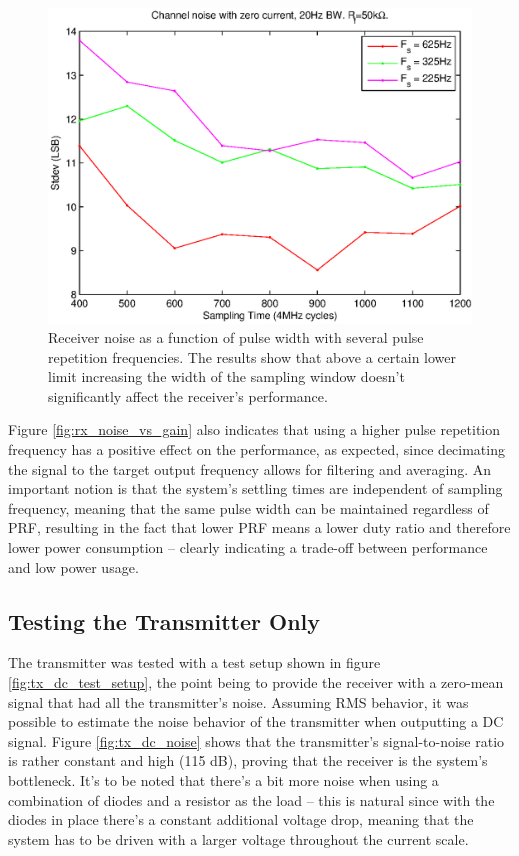 \begin{figure}[htcb]
\begin{center}
\includegraphics[scale=0.8]{kuvat/measurements/rx_noise_vs_pulse_length.eps}
\caption{Receiver noise as a function of pulse width with several pulse repetition frequencies. The results show that above a certain lower limit increasing the width of the sampling window doesn't significantly affect the receiver's performance.}
\label{fig:rx_noise_vs_pulse_length}
\end{center}
\end{figure}

Figure \ref{fig:rx_noise_vs_gain} also indicates that using a higher pulse repetition frequency has a positive effect on the performance, as expected, since decimating the signal to the target output frequency allows for filtering and averaging. An important notion is that the system's settling times are independent of sampling frequency, meaning that the same pulse width can be maintained regardless of PRF, resulting in the fact that lower PRF means a lower duty ratio and therefore lower power consumption -- clearly indicating a trade-off between performance and low power usage.

\subsection{Testing the Transmitter Only}

The transmitter was tested with a test setup shown in figure \ref{fig:tx_dc_test_setup}, the point being to provide the receiver with a zero-mean signal that had all the transmitter's noise. Assuming RMS behavior, it was possible to estimate the noise behavior of the transmitter when outputting a DC signal. Figure \ref{fig:tx_dc_noise} shows that the transmitter's signal-to-noise ratio is rather constant and high (115 dB), proving that the receiver is the system's bottleneck. It's to be noted that there's a bit more noise when using a combination of diodes and a resistor as the load -- this is natural since with the diodes in place there's a constant additional voltage drop, meaning that the system has to be driven with a larger voltage throughout the current scale.

